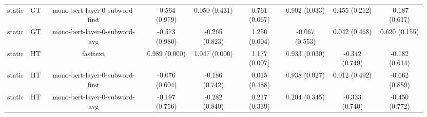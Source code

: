 \begin{sidewaystable}[htb]
\begin{tabular}{@{}ccccccccc@{}}
        static & GT & mono-bert-layer-0-subword-first & -0.564 (0.979) & 0.050 (0.431) & 0.761 (0.067) & 0.902 (0.033) & 0.455 (0.212) & -0.187 (0.617) \\
        static & GT & mono-bert-layer-0-subword-avg & -0.573 (0.980) & -0.265 (0.823) & 1.250 (0.004) & -0.067 (0.553) & 0.042 (0.468) & 0.620 (0.155) \\
        static & HT & fasttext & 0.989 (0.000) & 1.047 (0.000) & 1.177 (0.007) & 0.933 (0.030) & -0.342 (0.749) & -0.182 (0.614) \\
        static & HT & mono-bert-layer-0-subword-first & -0.076 (0.604) & -0.186 (0.742) & 0.015 (0.488) & 0.938 (0.027) & 0.012 (0.492) & -0.662 (0.859) \\
        static & HT & mono-bert-layer-0-subword-avg & -0.197 (0.756) & -0.282 (0.840) & 0.217 (0.339) & 0.204 (0.345) & -0.333 (0.740) & -0.450 (0.772) \\
        \bottomrule
    \end{tabular}
\end{sidewaystable}